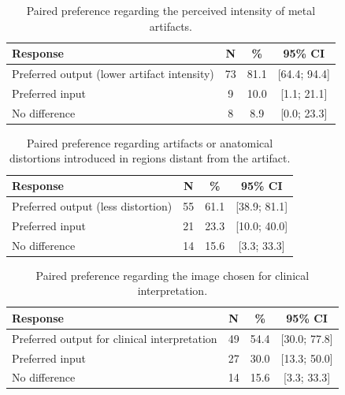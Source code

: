 \begin{table}[htbp]
\centering
\small
\begin{tabular}{lccc}
\toprule
\textbf{Response} & \textbf{N} & \textbf{\%} & \textbf{95\% CI} \\
\midrule
Preferred output (lower artifact intensity) & 73 & 81.1 & [64.4; 94.4] \\
Preferred input & 9 & 10.0 & [1.1; 21.1] \\
No difference & 8 & 8.9 & [0.0; 23.3] \\
\bottomrule
\end{tabular}
\captionsetup{skip=2pt}
\caption[Secondary outcome: artifact intensity]{Paired preference regarding the perceived intensity of metal artifacts.}
\label{tab:external-secondary-artifact-intensity}
\end{table}

\begin{table}[htbp]
\centering
\small
\begin{tabular}{lccc}
\toprule
\textbf{Response} & \textbf{N} & \textbf{\%} & \textbf{95\% CI} \\
\midrule
Preferred output (less distortion) & 55 & 61.1 & [38.9; 81.1] \\
Preferred input & 21 & 23.3 & [10.0; 40.0] \\
No difference & 14 & 15.6 & [3.3; 33.3] \\
\bottomrule
\end{tabular}
\captionsetup{skip=2pt}
\caption[Secondary outcome: distortion in other regions]{Paired preference regarding artifacts or anatomical distortions introduced in regions distant from the artifact.}
\label{tab:external-secondary-distortion}
\end{table}

\begin{table}[htbp]
\centering
\small
\begin{tabular}{lccc}
\toprule
\textbf{Response} & \textbf{N} & \textbf{\%} & \textbf{95\% CI} \\
\midrule
Preferred output for clinical interpretation & 49 & 54.4 & [30.0; 77.8] \\
Preferred input & 27 & 30.0 & [13.3; 50.0] \\
No difference & 14 & 15.6 & [3.3; 33.3] \\
\bottomrule
\end{tabular}
\captionsetup{skip=2pt}
\caption[Secondary outcome: clinical preference]{Paired preference regarding the image chosen for clinical interpretation.}
\label{tab:external-secondary-clinical-preference}
\end{table}


